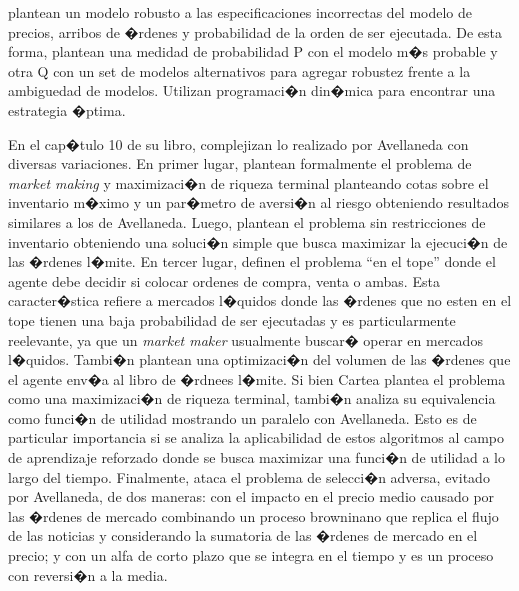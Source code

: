 \documentclass[12pt,a4paper,spanish]{article}%
\begin{document}
\cite{Cartea2013} plantean un modelo robusto a las especificaciones incorrectas del modelo de precios, arribos de �rdenes y probabilidad de la orden de ser ejecutada. De esta forma, plantean una medidad de probabilidad P con el modelo m�s probable y otra Q con un set de modelos alternativos para agregar robustez frente a la ambiguedad de modelos. Utilizan programaci�n din�mica para encontrar una estrategia �ptima.

En el cap�tulo 10 de su libro, \cite{Cartea2019a} complejizan lo realizado por Avellaneda con diversas variaciones. 
En primer lugar, plantean formalmente el problema de \textit{market making} y maximizaci�n de riqueza terminal planteando cotas sobre el inventario m�ximo y un par�metro de aversi�n al riesgo obteniendo resultados similares a los de Avellaneda.
Luego, plantean el problema sin restricciones de inventario obteniendo una soluci�n simple que busca maximizar la ejecuci�n de las �rdenes l�mite.
En tercer lugar, definen el problema ``en el tope'' donde el agente debe decidir si colocar ordenes de compra, venta o ambas. Esta caracter�stica refiere a mercados l�quidos donde las �rdenes que no esten en el tope tienen una baja probabilidad de ser ejecutadas y es particularmente reelevante, ya que un \textit{market maker} usualmente buscar� operar en mercados l�quidos.
Tambi�n plantean una optimizaci�n del volumen de las �rdenes que el agente env�a al libro de �rdnees l�mite.
Si bien Cartea plantea el problema como una maximizaci�n de riqueza terminal, tambi�n analiza su equivalencia como funci�n de utilidad mostrando un paralelo con Avellaneda. Esto es de particular importancia si se analiza la aplicabilidad de estos algoritmos al campo de aprendizaje reforzado donde se busca maximizar una funci�n de utilidad a lo largo del tiempo.
Finalmente, ataca el problema de selecci�n adversa, evitado por Avellaneda, de dos maneras: con el impacto en el precio medio causado por las �rdenes de mercado combinando un proceso browninano que replica el flujo de las noticias y considerando la sumatoria de las �rdenes de mercado en el precio; y con un alfa de corto plazo que se integra en el tiempo y es un proceso con reversi�n a la media.
\end{document}
